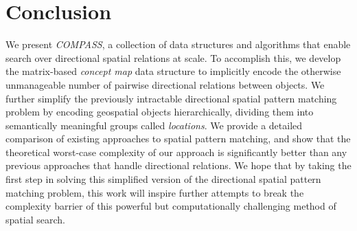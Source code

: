 \section{Conclusion}
\label{section:conclusion}
\normalsize
We present \emph{COMPASS}, a collection of data structures and algorithms that enable search over directional spatial relations at scale. 
To accomplish this, we develop the matrix-based \textit{concept map} data structure to implicitly encode the otherwise unmanageable number of pairwise directional relations between objects.
We further simplify the previously intractable directional spatial pattern matching problem by encoding geospatial objects hierarchically, dividing them into semantically meaningful groups called \textit{locations}. 
We provide a detailed comparison of existing approaches to spatial pattern matching, and show that the theoretical worst-case complexity of our approach is significantly better than any previous approaches that handle directional relations.
We hope that by taking the first step in solving this simplified version of the directional spatial pattern matching problem, this work will inspire further attempts to break the complexity barrier of this powerful but computationally challenging method of spatial search.



 

 











